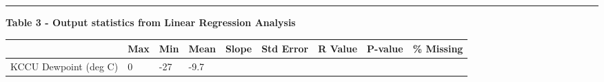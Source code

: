 \documentclass[11pt]{article}
\begin{document}
\begin{center}\rule{0.5\linewidth}{\linethickness}\end{center}

\textbf{Table 3 - Output statistics from Linear Regression Analysis}

\begin{longtable}[]{@{}lllllllll@{}}
\toprule
\begin{minipage}[b]{0.25\columnwidth}\raggedright\strut
\strut
\end{minipage} & \begin{minipage}[b]{0.06\columnwidth}\raggedright\strut
Max\strut
\end{minipage} & \begin{minipage}[b]{0.06\columnwidth}\raggedright\strut
Min\footnotemark{}\strut
\end{minipage}
\footnotetext{} &
\begin{minipage}[b]{0.08\columnwidth}\raggedright\strut
Mean\footnotemark{}\strut
\end{minipage}
\footnotetext{} &
\begin{minipage}[b]{0.05\columnwidth}\raggedright\strut
Slope\strut
\end{minipage} & \begin{minipage}[b]{0.07\columnwidth}\raggedright\strut
Std Error\strut
\end{minipage} & \begin{minipage}[b]{0.06\columnwidth}\raggedright\strut
R Value\strut
\end{minipage} & \begin{minipage}[b]{0.06\columnwidth}\raggedright\strut
P-value\strut
\end{minipage} & \begin{minipage}[b]{0.07\columnwidth}\raggedright\strut
\% Missing\strut
\end{minipage}\tabularnewline
\midrule
\endhead
\begin{minipage}[t]{0.25\columnwidth}\raggedright\strut
KCCU Dewpoint (deg C)\strut
\end{minipage} & \begin{minipage}[t]{0.06\columnwidth}\raggedright\strut
0\strut
\end{minipage} & \begin{minipage}[t]{0.06\columnwidth}\raggedright\strut
-27\strut
\end{minipage} & \begin{minipage}[t]{0.08\columnwidth}\raggedright\strut
-9.7\strut
\end{minipage} & \begin{minipage}[t]{0.05\columnwidth}\raggedright\strut

\end{minipage}
\end{longtable}
\end{document}
